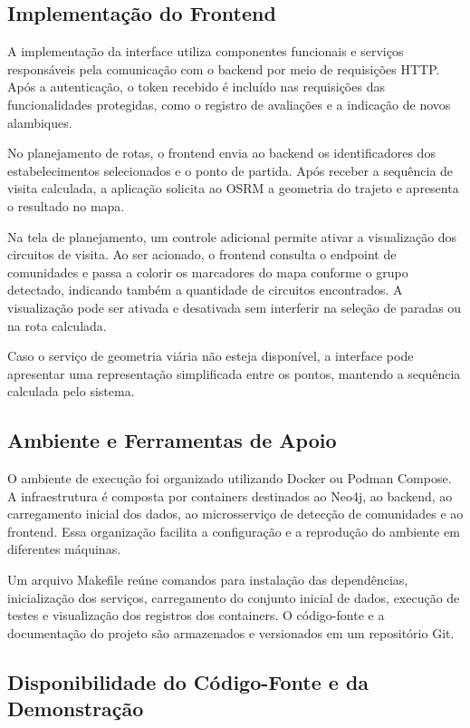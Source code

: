 \documentclass{jaes}
\begin{document}
\subsection{Implementação do Frontend}

A implementação da interface utiliza componentes funcionais e serviços responsáveis pela comunicação com o backend por meio de requisições HTTP. Após a autenticação, o token recebido é incluído nas requisições das funcionalidades protegidas, como o registro de avaliações e a indicação de novos alambiques.

No planejamento de rotas, o frontend envia ao backend os identificadores dos estabelecimentos selecionados e o ponto de partida. Após receber a sequência de visita calculada, a aplicação solicita ao OSRM a geometria do trajeto e apresenta o resultado no mapa.

Na tela de planejamento, um controle adicional permite ativar a visualização dos circuitos de visita. Ao ser acionado, o frontend consulta o endpoint de comunidades e passa a colorir os marcadores do mapa conforme o grupo detectado, indicando também a quantidade de circuitos encontrados. A visualização pode ser ativada e desativada sem interferir na seleção de paradas ou na rota calculada.

Caso o serviço de geometria viária não esteja disponível, a interface pode apresentar uma representação simplificada entre os pontos, mantendo a sequência calculada pelo sistema.

\subsection{Ambiente e Ferramentas de Apoio}

O ambiente de execução foi organizado utilizando Docker ou Podman Compose. A infraestrutura é composta por containers destinados ao Neo4j, ao backend, ao carregamento inicial dos dados, ao microsserviço de detecção de comunidades e ao frontend. Essa organização facilita a configuração e a reprodução do ambiente em diferentes máquinas.

Um arquivo Makefile reúne comandos para instalação das dependências, inicialização dos serviços, carregamento do conjunto inicial de dados, execução de testes e visualização dos registros dos containers. O código-fonte e a documentação do projeto são armazenados e versionados em um repositório Git.

\subsection{Disponibilidade do Código-Fonte e da Demonstração}
\end{document}
